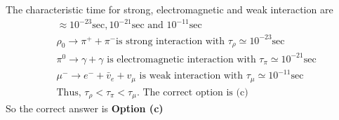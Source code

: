 \begin{enumerate}
\begin{answer}
	 The characteristic time for strong, electromagnetic and weak interaction are 
	\begin{align*}
	&\approx 10^{-23} \mathrm{sec}, 10^{-21} \mathrm{sec}\text{ and } 10^{-11} \mathrm{sec}\\
	&\rho_{0} \rightarrow \pi^{+}+\pi^{-}\text{is strong interaction with }\tau_{\rho} \simeq 10^{-23} \mathrm{sec}\\
	&\pi^{0} \rightarrow \gamma+\gamma\text{ is electromagnetic interaction with }\tau_{\pi} \simeq 10^{-21} \mathrm{sec}\\
	&\mu^{-} \rightarrow e^{-}+\bar{v}_{e}+v_{\mu}\text{ is weak interaction with }\tau_{\mu} \simeq 10^{-11} \mathrm{sec}\\
	&\text{Thus, }\tau_{\rho}<\tau_{\pi}<\tau_{\mu}.\text{ The correct option is (c)}
	\end{align*}
	So the correct answer is \textbf{Option (c)}
\end{answer}
\end{enumerate}
